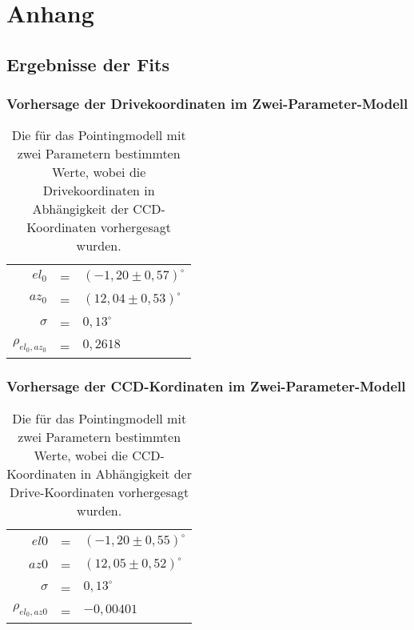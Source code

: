 \chapter{Anhang}
\section*{Ergebnisse der Fits}
\subsection*{Vorhersage der Drivekoordinaten im Zwei-Parameter-Modell}
\begin{table}[htbp]
\centering
\begin{tabular}{rcl}
\toprule
$el_0$ &=& $(-1,20\pm0,57)^{\circ}$\\
$az_0$ &=& $(12,04\pm0,53)^{\circ}$\\
$\sigma$ &=& $0,13^{\circ}$\\
$\rho_{el_0,az_0}$ &=& $0,2618$\\
\bottomrule
\end{tabular}
\caption{Die für das Pointingmodell mit zwei Parametern bestimmten Werte, wobei die Drivekoordinaten in Abhängigkeit der CCD-Koordinaten vorhergesagt wurden.}
\label{tab:C2D-}
\end{table}
\subsection*{Vorhersage der CCD-Kordinaten im Zwei-Parameter-Modell}
\begin{table}[htbp]
\centering
\begin{tabular}{rcl}
\toprule
$el0$ &=& $(-1,20\pm0,55)^{\circ}$\\
$az0$ &=& $(12,05\pm0,52)^{\circ}$\\
$\sigma$ &=& $0,13^{\circ}$\\
$\rho_{el_0,az0}$ &=& $-0,00401$\\
\bottomrule
\end{tabular}
\caption{Die für das Pointingmodell mit zwei Parametern bestimmten Werte, wobei die CCD-Koordinaten in Abhängigkeit der Drive-Koordinaten vorhergesagt wurden.}
\label{tab:D2C-}
\end{table}
